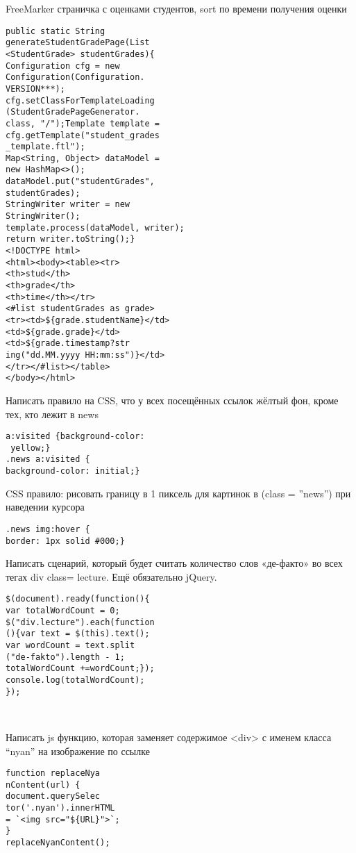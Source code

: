 \documentclass{article}
\begin{document}
\begin{minipage}{.2\textwidth}
FreeMarker страничка с оценками студентов, sort по времени получения оценки
\begin{lstlisting}
public static String 
generateStudentGradePage(List
<StudentGrade> studentGrades){
Configuration cfg = new 
Configuration(Configuration.
VERSION***);
cfg.setClassForTemplateLoading
(StudentGradePageGenerator.
class, "/");Template template =
cfg.getTemplate("student_grades
_template.ftl");
Map<String, Object> dataModel =
new HashMap<>();
dataModel.put("studentGrades",
studentGrades);
StringWriter writer = new 
StringWriter();
template.process(dataModel, writer);
return writer.toString();}
<!DOCTYPE html>
<html><body><table><tr>
<th>stud</th>
<th>grade</th>
<th>time</th></tr>
<#list studentGrades as grade>
<tr><td>${grade.studentName}</td>
<td>${grade.grade}</td>
<td>${grade.timestamp?str
ing("dd.MM.yyyy HH:mm:ss")}</td>
</tr></#list></table>
</body></html>
\end{lstlisting}
\end{minipage}
\hfill
\begin{minipage}{.2\textwidth}
Написать правило на CSS, что у всех посещённых ссылок жёлтый фон, кроме тех, кто лежит в news
\begin{lstlisting}
a:visited {background-color:
 yellow;}
.news a:visited {
background-color: initial;}
\end{lstlisting}
\end{minipage}
\hfill
\begin{minipage}{.2\textwidth}
CSS правило: рисовать границу в 1 пиксель для картинок в (class = ”news”) при наведении курсора
\begin{lstlisting}
.news img:hover {
border: 1px solid #000;}
\end{lstlisting}
\end{minipage}
\hfill
\begin{minipage}{.2\textwidth}
Написать сценарий, который будет считать
 количество слов «де-факто» во всех тегах div class= lecture. 
 Ещё обязательно jQuery.
\begin{lstlisting}
$(document).ready(function(){
var totalWordCount = 0;
$("div.lecture").each(function
(){var text = $(this).text();
var wordCount = text.split
("de-fakto").length - 1; 
totalWordCount +=wordCount;});
console.log(totalWordCount);
});
\end{lstlisting}
\end{minipage}
\\
\begin{minipage}{.2\textwidth}
Написать js функцию, которая заменяет содержимое <div> 
с именем класса “nyan” на изображение по ссылке
\begin{lstlisting}
function replaceNya
nContent(url) {
document.querySelec
tor('.nyan').innerHTML 
= `<img src="${URL}">`;
}
replaceNyanContent();
\end{lstlisting}
\end{minipage}
\end{document}
